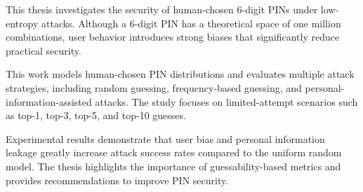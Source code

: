 This thesis investigates the security of human-chosen 6-digit PINs under low-entropy attacks. 
Although a 6-digit PIN has a theoretical space of one million combinations, user behavior 
introduces strong biases that significantly reduce practical security.

This work models human-chosen PIN distributions and evaluates multiple attack strategies, 
including random guessing, frequency-based guessing, and personal-information-assisted attacks. 
The study focuses on limited-attempt scenarios such as top-1, top-3, top-5, and top-10 guesses.

Experimental results demonstrate that user bias and personal information leakage greatly increase 
attack success rates compared to the uniform random model. The thesis highlights the importance 
of guessability-based metrics and provides recommendations to improve PIN security.